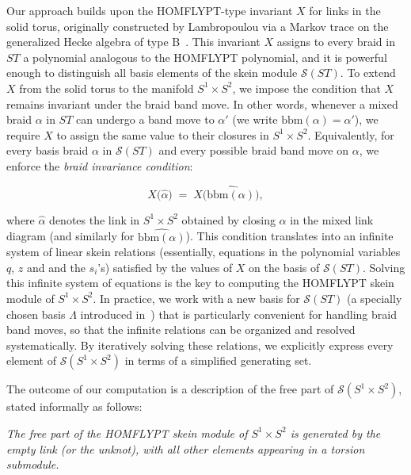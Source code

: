 \documentclass[11pt]{amsart}
\begin{document}
Our approach builds upon the HOMFLYPT-type invariant $X$ for links in the solid torus, originally constructed by Lambropoulou via a Markov trace on the generalized Hecke algebra of type B~\cite{La1}. This invariant $X$ assigns to every braid in $ST$ a polynomial analogous to the HOMFLYPT polynomial, and it is powerful enough to distinguish all basis elements of the skein module $\mathcal{S}(ST)$. To extend $X$ from the solid torus to the manifold $S^1 \times S^2$, we impose the condition that $X$ remains invariant under the braid band move. In other words, whenever a mixed braid $\alpha$ in $ST$ can undergo a band move to $\alpha'$ (we write $\text{bbm}(\alpha) = \alpha'$), we require $X$ to assign the same value to their closures in $S^1 \times S^2$. Equivalently, for every basis braid $\alpha$ in $\mathcal{S}(ST)$ and every possible braid band move on $\alpha$, we enforce the \emph{braid invariance condition}:

\begin{equation}\label{system}
    X\big(\widehat{\alpha}\big) \;=\; X\big(\widehat{\text{bbm}(\alpha)}\big),
\end{equation}

\noindent where $\widehat{\alpha}$ denotes the link in $S^1 \times S^2$ obtained by closing $\alpha$ in the mixed link diagram (and similarly for $\widehat{\text{bbm}(\alpha)}$). This condition translates into an infinite system of linear skein relations (essentially, equations in the polynomial variables $q$, $z$ and and the $s_i$'s) satisfied by the values of $X$ on the basis of $\mathcal{S}(ST)$. Solving this infinite system of equations is the key to computing the HOMFLYPT skein module of $S^1 \times S^2$. In practice, we work with a new basis for $\mathcal{S}(ST)$ (a specially chosen basis $\Lambda$ introduced in~\cite{DL2}) that is particularly convenient for handling braid band moves, so that the infinite relations can be organized and resolved systematically. By iteratively solving these relations, we explicitly express every element of $\mathcal{S}(S^1 \times S^2)$ in terms of a simplified generating set.

The outcome of our computation is a description of the free part of $\mathcal{S}(S^1 \times S^2)$, stated informally as follows:

\smallbreak

\emph{The free part of the HOMFLYPT skein module of $S^1 \times S^2$ is generated by the empty link (or the unknot), with all other elements appearing in a torsion submodule.}
\end{document}
